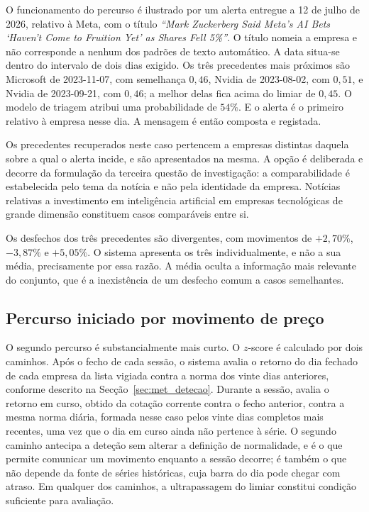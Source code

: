 O funcionamento do percurso é ilustrado por um alerta entregue a 12 de julho de 2026, relativo à
Meta, com o título \emph{``Mark Zuckerberg Said Meta's AI Bets `Haven't Come to Fruition Yet' as
Shares Fell 5\%''}. O título nomeia a empresa e não corresponde a nenhum dos padrões de texto automático. A data
situa-se dentro do intervalo de dois dias exigido. Os três precedentes mais próximos são Microsoft
de 2023-11-07, com semelhança $0{,}46$, Nvidia de 2023-08-02, com $0{,}51$, e Nvidia de
2023-09-21, com $0{,}46$; a melhor delas fica acima do limiar de $0{,}45$. O modelo de triagem
atribui uma probabilidade de $54\%$. E o alerta é o primeiro relativo à empresa nesse dia. A mensagem é então composta e registada.

Os precedentes recuperados neste caso pertencem a empresas distintas daquela sobre a qual o alerta
incide, e são apresentados na mesma. A opção é deliberada e decorre da formulação da terceira
questão de investigação: a comparabilidade é estabelecida pelo tema da notícia e não pela
identidade da empresa. Notícias relativas a investimento em inteligência artificial em empresas
tecnológicas de grande dimensão constituem casos comparáveis entre si.

Os desfechos dos três precedentes são divergentes, com movimentos de $+2{,}70\%$, $-3{,}87\%$ e
$+5{,}05\%$. O sistema apresenta os três individualmente, e não a sua média, precisamente por essa
razão. A média oculta a informação mais relevante do conjunto, que é a inexistência de um desfecho
comum a casos semelhantes.

\subsection{Percurso iniciado por movimento de preço}

O segundo percurso é substancialmente mais curto. O $z$-score é calculado por dois caminhos. Após o
fecho de cada sessão, o sistema avalia o retorno do dia fechado de cada empresa da lista vigiada
contra a norma dos vinte dias anteriores, conforme descrito na Secção~\ref{sec:met_detecao}. Durante
a sessão, avalia o retorno em curso, obtido da cotação corrente contra o fecho anterior, contra a
mesma norma diária, formada nesse caso pelos vinte dias completos mais recentes, uma vez que o dia
em curso ainda não pertence à série. O segundo caminho antecipa a deteção sem alterar a definição de
normalidade, e é o que permite comunicar um movimento enquanto a sessão decorre; é também o que não
depende da fonte de séries históricas, cuja barra do dia pode chegar com atraso. Em qualquer dos
caminhos, a ultrapassagem do limiar constitui condição suficiente para avaliação.

